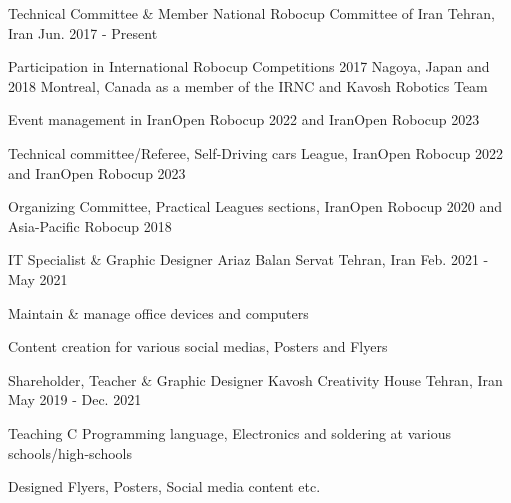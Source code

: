 


\begin{cventries}


\cventry
{Technical Committee \& Member} %
{National Robocup Committee of Iran} %
{Tehran, Iran} %
{Jun. 2017 - Present} %
{ %
\begin{cvitems}
\item {Participation in International Robocup Competitions 2017 Nagoya, Japan and 2018 Montreal, Canada as a member of the IRNC and Kavosh Robotics Team}
\item {Event management in IranOpen Robocup 2022 and IranOpen Robocup 2023}
\item {Technical committee/Referee, Self-Driving cars League, IranOpen Robocup 2022 and IranOpen Robocup 2023}
\item {Organizing Committee, Practical Leagues sections, IranOpen Robocup 2020 and Asia-Pacific Robocup 2018}
\end{cvitems}
}


\cventry
{IT Specialist \& Graphic Designer} %
{Ariaz Balan Servat} %
{Tehran, Iran} %
{Feb. 2021 - May 2021} %
{ %
\begin{cvitems}
\item {Maintain \& manage office devices and computers}
\item {Content creation for various social medias, Posters and Flyers}
\end{cvitems}
}


\cventry
{Shareholder, Teacher \& Graphic Designer} %
{Kavosh Creativity House} %
{Tehran, Iran} %
{May 2019 - Dec. 2021} %
{ %
\begin{cvitems}
\item {Teaching C Programming language, Electronics and soldering at various schools/high-schools}
\item {Designed Flyers, Posters, Social media content etc.}
\end{cvitems} 
}


\end{cventries}
